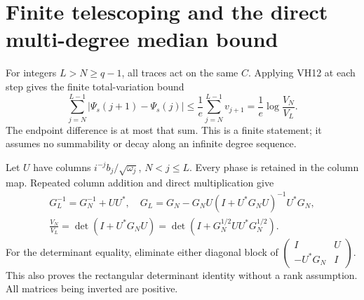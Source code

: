 \section{Finite telescoping and the direct multi-degree median bound}

For integers \(L>N\ge q-1\), all traces act on the same \(C\).
Applying VH12 at each step gives the finite total-variation bound
\begin{equation}\tag{VH13}\label{hvh:VH13}
\sum_{j=N}^{L-1}|\Psi_s(j+1)-\Psi_s(j)|
\le\frac1e\sum_{j=N}^{L-1}v_{j+1}
=\frac1e\log\frac{V_N}{V_L}.
\end{equation}
The endpoint difference is at most that sum. This is a finite statement;
it assumes no summability or decay along an infinite degree sequence.

Let \(U\) have columns \(i^{-j}b_j/\sqrt{\omega_j}\), \(N<j\le L\).
Every phase is retained in the column map. Repeated column addition
and direct multiplication give
\begin{equation}\tag{VH14}\label{hvh:VH14}
\begin{gathered}
G_L^{-1}=G_N^{-1}+UU^*,\quad
G_L=G_N-G_NU(I+U^*G_NU)^{-1}U^*G_N,\\
\frac{V_N}{V_L}=\det(I+U^*G_NU)
=\det(I+G_N^{1/2}UU^*G_N^{1/2}).
\end{gathered}
\end{equation}
For the determinant equality, eliminate either diagonal block of
\(\left(\begin{smallmatrix}I&U\\-U^*G_N&I\end{smallmatrix}\right)\).
This also proves the rectangular determinant identity without a rank
assumption. All matrices being inverted are positive.

